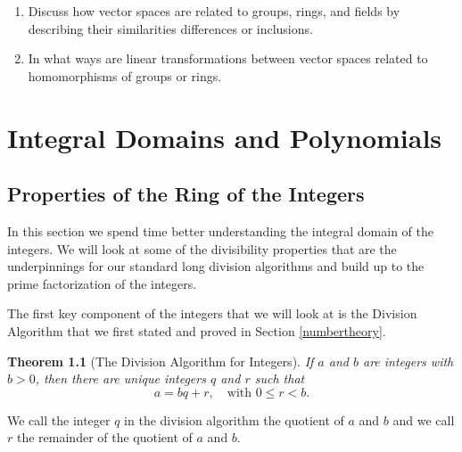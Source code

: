\documentclass[
]{book}
\providecommand{\tightlist}{%
  \setlength{\itemsep}{0pt}\setlength{\parskip}{0pt}}
\let\stdsection\section
\renewcommand\section{\newpage\stdsection}
\newtheorem{theorem}{Theorem}[chapter]
\theoremstyle{definition}
\theoremstyle{definition}
\theoremstyle{definition}
\theoremstyle{definition}
\theoremstyle{remark}
\begin{document}
\begin{enumerate}
  \begin{enumerate}
  \def\labelenumii{\alph{enumii}.}
  \tightlist
  \item
    Discuss how vector spaces are related to groups, rings, and fields by describing their similarities differences or inclusions.
  \item
    In what ways are linear transformations between vector spaces related to homomorphisms of groups or rings.
  \end{enumerate}
\end{enumerate}

\hypertarget{rings}{%
\chapter{Integral Domains and Polynomials}\label{rings}}

\hypertarget{Integer-Ring}{%
\section{Properties of the Ring of the Integers}\label{Integer-Ring}}

In this section we spend time better understanding the integral domain of the integers. We will look at some of the divisibility properties that are the underpinnings for our standard long division algorithms and build up to the prime factorization of the integers.

The first key component of the integers that we will look at is the Division Algorithm that we first stated and proved in Section \ref{numbertheory}.

\begin{theorem}[The Division Algorithm for Integers]
\protect\hypertarget{thm:division-algorithm}{}\label{thm:division-algorithm}If \(a\) and \(b\) are integers with \(b>0\), then there are unique integers \(q\) and \(r\) such that \[a=bq+r, \quad \mbox{with } 0\leq r <b.\]
\end{theorem}

We call the integer \(q\) in the division algorithm the quotient of \(a\) and \(b\) and we call \(r\) the remainder of the quotient of \(a\) and \(b\).
\end{document}
